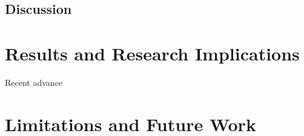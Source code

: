 \subsection{Discussion}
\label{subsec:PenCTDiscussion}



\section{Results and Research Implications}
\label{sec:PenImplications}

Recent advance

\section{Limitations and Future Work}
\label{sec:PenLimitations}